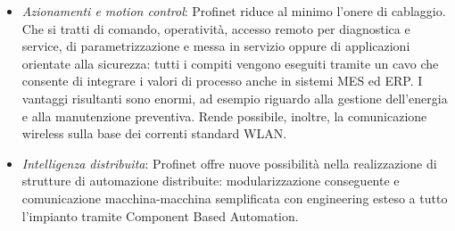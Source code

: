 \documentclass[12pt, a4paper, oneside]{book}
\begin{document}
\begin{itemize}
	\item \textit{Azionamenti e motion control}: Profinet riduce al minimo l’onere di cablaggio. Che si tratti di comando, operatività, accesso remoto per diagnostica e service, di parametrizzazione e messa in servizio oppure di applicazioni orientate alla sicurezza: tutti
	i compiti vengono eseguiti tramite un cavo che consente di integrare i valori di processo anche in sistemi MES ed ERP. I vantaggi risultanti sono enormi, ad esempio riguardo alla gestione dell’energia e alla manutenzione preventiva. Rende possibile, inoltre, la comunicazione wireless sulla base dei correnti standard WLAN. 
	\item \textit{Intelligenza distribuita}: Profinet offre nuove possibilità nella realizzazione di 	strutture di automazione distribuite: modularizzazione conseguente e comunicazione macchina-macchina semplificata con engineering esteso a tutto l’impianto tramite Component Based Automation.
\end{itemize}
\end{document}
